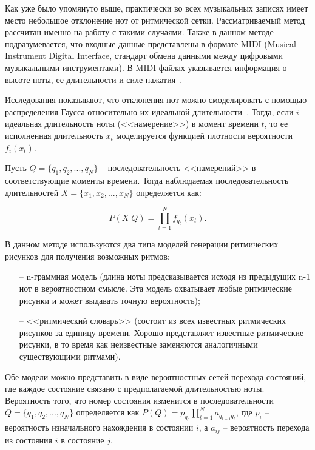 Как уже было упомянуто выше, практически во всех музыкальных записях имеет место небольшое отклонение нот от ритмической сетки. Рассматриваемый метод рассчитан именно на работу с такими случаями. Также в данном методе подразумевается, что входные данные представлены в формате MIDI (Musical Instrument Digital Interface, стандарт обмена данными между цифровыми музыкальными инструментами). В MIDI файлах указывается информация о высоте ноты, ее длительности и силе нажатия~\cite{midi}.

Исследования показывают, что отклонения нот можно смоделировать с помощью распределения Гаусса относительно их идеальной длительности~\cite{hmm}. Тогда, если $i$ -- идеальная длительность ноты (<<намерение>>) в момент времени $t$, то ее исполненная длительность $x_t$ моделируется функцией плотности вероятности $f_i(x_t)$.

Пусть $Q = \{q_1, q_2, ..., q_N\}$ -- последовательность <<намерений>> в соответствующие моменты времени. Тогда наблюдаемая последовательность длительностей $X = \{x_1, x_2, ..., x_N\}$ определяется как:

\begin{equation}
	P(X|Q) = \prod_{t=1}^N f_{q_t}(x_t).
\end{equation}

В данном методе используются два типа моделей генерации ритмических рисунков для получения возможных ритмов:

\begin{itemize}
	\item[--] n-граммная модель (длина ноты предсказывается исходя из предыдущих n-1 нот в вероятностном смысле. Эта модель охватывает любые ритмические рисунки и может выдавать точную вероятность);
	\item[--] <<ритмический словарь>> (состоит из всех известных ритмических рисунков за единицу времени. Хорошо представляет известные ритмические рисунки, в то время как неизвестные заменяются аналогичными существующими ритмами).
\end{itemize}

Обе модели можно представить в виде вероятностных сетей перехода состояний, где каждое состояние связано с предполагаемой длительностью ноты. Вероятность того, что номер состояния изменится в последовательности $Q = \{q_1, q_2, ..., q_N\}$ определяется как $P(Q) = p_{q_0} \prod_{t=1}^N a_{q_{t-1}q_t}$, где $p_i$ -- вероятность изначального нахождения в состоянии $i$, а $a_{ij}$ -- вероятность перехода из состояния $i$ в состояние $j$.

